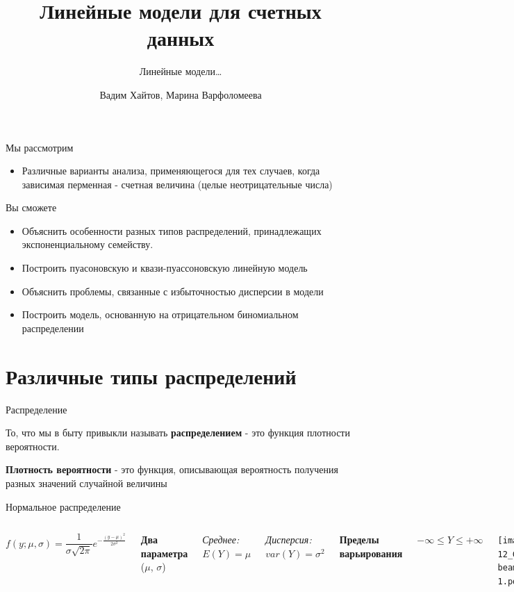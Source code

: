 \documentclass[ignorenonframetext,]{beamer}
\title{Линейные модели для счетных данных}
\subtitle{Линейные модели\ldots{}}
\author{Вадим Хайтов, Марина Варфоломеева}
\date{}
\providecommand{\tightlist}{%
\setlength{\itemsep}{0pt}\setlength{\parskip}{0pt}}
\newcommand{\columnsbegin}{\begin{columns}}
\newcommand{\columnsend}{\end{columns}}
\begin{document}
\frame{\titlepage}

\begin{frame}{Мы рассмотрим}

\begin{itemize}
\tightlist
\item
  Различные варианты анализа, применяющегося для тех случаев, когда
  зависимая перменная - счетная величина (целые неотрицательные числа)
\end{itemize}

\begin{block}{Вы сможете}

\begin{itemize}
\tightlist
\item
  Объяснить особенности разных типов распределений, принадлежащих
  экспоненциальному семейству.
\item
  Построить пуасоновскую и квази-пуассоновскую линейную модель
\item
  Объяснить проблемы, связанные с избыточностью дисперсии в модели
\item
  Построить модель, основанную на отрицательном биномиальном
  распределении
\end{itemize}

\end{block}

\end{frame}

\section{Различные типы распределений}\label{--}

\begin{frame}{Распределение}

То, что мы в быту привыкли называть \textbf{распределением} - это
функция плотности вероятности.

\textbf{Плотность вероятности} - это функция, описывающая вероятность
получения разных значений случайной величины

\end{frame}

\begin{frame}{Нормальное распределение}

\columnsbegin


\[f(y;\mu, \sigma)= \frac {1}{\sigma \sqrt{2 \pi}} e^{-\frac{(y-\mu)^2}{2\sigma^2}}\]

\textbf{Два параметра} (\(\mu\), \(\sigma\))

\it {Среднее}:  $E(Y)  = \mu$

\it {Дисперсия}: $var(Y) = \sigma^2$

\textbf {Пределы варьирования}

\(-\infty \le Y \le +\infty\)


\texttt{[image: 12\_GLM\_count2\_files/figure-beamer/unnamed-chunk-1-1.pdf]}

\columnsend

\end{frame}
\end{document}
